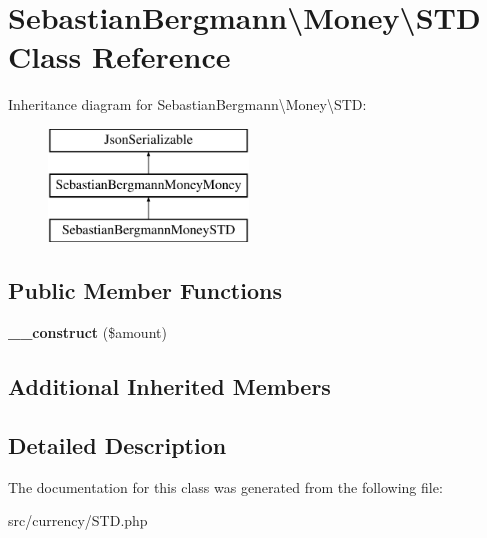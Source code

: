 \hypertarget{classSebastianBergmann_1_1Money_1_1STD}{}\section{Sebastian\+Bergmann\textbackslash{}Money\textbackslash{}S\+T\+D Class Reference}
\label{classSebastianBergmann_1_1Money_1_1STD}
Inheritance diagram for Sebastian\+Bergmann\textbackslash{}Money\textbackslash{}S\+T\+D\+:\begin{figure}[H]
\begin{center}
\leavevmode
\includegraphics[height=3.000000cm]{classSebastianBergmann_1_1Money_1_1STD}
\end{center}
\end{figure}
\subsection*{Public Member Functions}
\begin{DoxyCompactItemize}
\item 
\hypertarget{classSebastianBergmann_1_1Money_1_1STD_ace5bff8c61e93fa35ab30148eaefb9a7}{}{\bfseries \+\_\+\+\_\+construct} (\$amount)\label{classSebastianBergmann_1_1Money_1_1STD_ace5bff8c61e93fa35ab30148eaefb9a7}

\end{DoxyCompactItemize}
\subsection*{Additional Inherited Members}


\subsection{Detailed Description}


The documentation for this class was generated from the following file\+:\begin{DoxyCompactItemize}
\item 
src/currency/S\+T\+D.\+php\end{DoxyCompactItemize}

